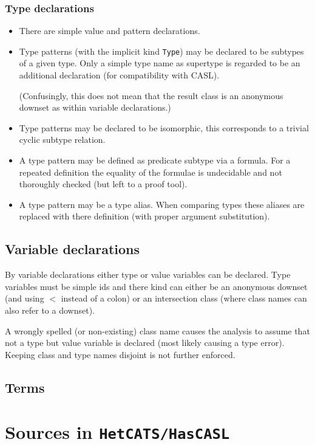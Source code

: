 \documentclass{article}
\begin{document}
\subsubsection*{Type declarations}

\begin{itemize}
\item There are simple value and pattern declarations. 
\item Type patterns (with the implicit kind \texttt{Type})
  may be declared to be subtypes of a given type. Only a simple type name as
  supertype is regarded to be an additional declaration (for compatibility
  with CASL).
  
  (Confusingly, this does not mean that the result class is an anonymous
  downset as within variable declarations.)
\item Type patterns may be declared to be isomorphic, this corresponds to a
  trivial cyclic subtype relation.
\item A type pattern may be defined as predicate subtype via a
  formula. For a repeated definition the equality of the formulae is
  undecidable and not thoroughly checked (but left to a proof tool).  
\item A type pattern may be a type alias. When comparing types these aliases
  are replaced with there definition (with proper argument substitution). 
\end{itemize}

\subsection{Variable declarations}

By variable declarations either type or value variables can be declared.
Type variables must be simple ids and there kind can either be an anonymous
downset (and using $<$ instead of a colon) or an intersection class (where
class names can also refer to a downset).

A wrongly spelled (or non-existing) class name causes the analysis to assume
that not a type but value variable is declared (most likely causing a type
error). Keeping class and type names disjoint is not further enforced.

\subsection{Terms}

\section{Sources in \texttt{HetCATS/HasCASL}}
\end{document}
